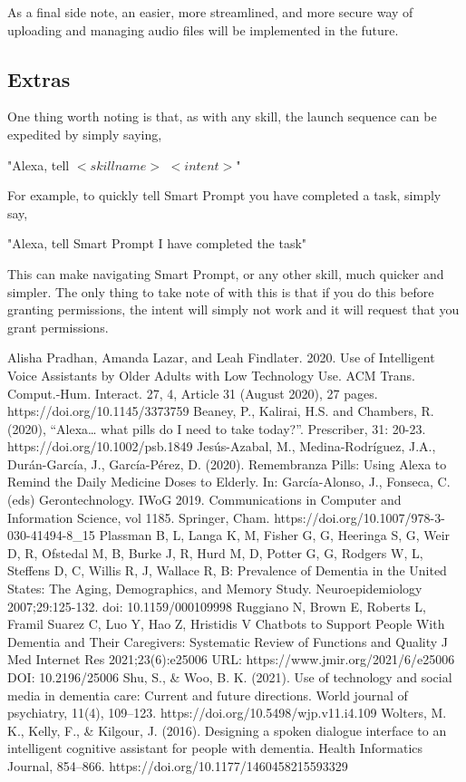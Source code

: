 \documentclass[11pt, oneside]{article}
\begin{document}
As a final side note, an easier, more streamlined, and more secure way of uploading and managing audio files will be implemented in the future.

\subsection{Extras}

One thing worth noting is that, as with any skill, the launch sequence can be expedited by simply saying,
\begin{center}
"Alexa, tell $<skill name>$ $<intent>$"
\end{center}
For example, to quickly tell Smart Prompt you have completed a task, simply say,
\begin{center}
"Alexa, tell Smart Prompt I have completed the task"
\end{center}
This can make navigating Smart Prompt, or any other skill, much quicker and simpler. The only thing to take note of with this is that if you do this before granting permissions, the intent will simply not work and it will request that you grant permissions.

\begin{thebibliography}{00}
 Alisha Pradhan, Amanda Lazar, and Leah Findlater. 2020. Use of Intelligent Voice Assistants by Older Adults with Low Technology Use. ACM Trans. Comput.-Hum. Interact. 27, 4, Article 31 (August 2020), 27 pages. https://doi.org/10.1145/3373759
 Beaney, P., Kalirai, H.S. and Chambers, R. (2020), “Alexa… what pills do I need to take today?”. Prescriber, 31: 20-23. https://doi.org/10.1002/psb.1849
 Jesús-Azabal, M., Medina-Rodríguez, J.A., Durán-García, J., García-Pérez, D. (2020). Remembranza Pills: Using Alexa to Remind the Daily Medicine Doses to Elderly. In: García-Alonso, J., Fonseca, C. (eds) Gerontechnology. IWoG 2019. Communications in Computer and Information Science, vol 1185. Springer, Cham. https://doi.org/10.1007/978-3-030-41494-8\_15
 Plassman B, L, Langa K, M, Fisher G, G, Heeringa S, G, Weir D, R, Ofstedal M, B, Burke J, R, Hurd M, D, Potter G, G, Rodgers W, L, Steffens D, C, Willis R, J, Wallace R, B: Prevalence of Dementia in the United States: The Aging, Demographics, and Memory Study. Neuroepidemiology 2007;29:125-132. doi: 10.1159/000109998
 Ruggiano N, Brown E, Roberts L, Framil Suarez C, Luo Y, Hao Z, Hristidis V
Chatbots to Support People With Dementia and Their Caregivers: Systematic Review of Functions and Quality
J Med Internet Res 2021;23(6):e25006
URL: https://www.jmir.org/2021/6/e25006
DOI: 10.2196/25006
 Shu, S., \& Woo, B. K. (2021). Use of technology and social media in dementia care: Current and future directions. World journal of psychiatry, 11(4), 109–123. https://doi.org/10.5498/wjp.v11.i4.109
 Wolters, M. K., Kelly, F., \& Kilgour, J. (2016). Designing a spoken dialogue interface to an intelligent cognitive assistant for people with dementia. Health Informatics Journal, 854–866. https://doi.org/10.1177/1460458215593329

\end{thebibliography}
\end{document}
